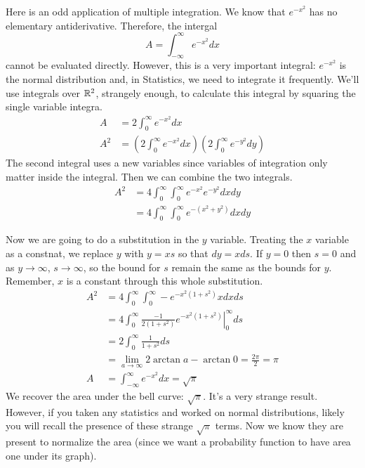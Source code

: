 \documentclass[fleqn,letterpaper]{report}
\begin{document}
\begin{example}
Here is an odd application of multiple integration. We know
that $e^{-x^2}$ has no elementary antiderivative. Therefore,
the intergal
\begin{equation*}
A = \int_{-\infty}^\infty e^{-x^2} dx 
\end{equation*}
cannot be evaluated directly. However, this is a very
important integral: $e^{-x^2}$ is the 
normal distribution and, in Statistics, we need to integrate 
it frequently. We'll use
integrals over $\mathbb{R}^2$, strangely enough, to calculate this
integral by squaring the single variable integra.
\begin{align*}
A & = 2 \int_{0}^\infty e^{-x^2} dx \\
A^2 & = \left( 2 \int_{0}^\infty e^{-x^2} dx \right) \left(2
\int_{0}^\infty e^{-y^2} dy \right) 
\end{align*}
The second integral uses a new variables since variables of
integration only matter inside the integral. Then we can
combine the two integrals.
\begin{align*}
A^2 & = 4 \int_0^\infty \int_0^\infty e^{-x^2} e^{-y^2} dx dy
\\
& = 4 \int_0^\infty \int_0^\infty e^{-(x^2 + y^2)} dx dy 
\end{align*}
\newpage

Now we are going to do a substitution in the $y$ variable.
Treating the $x$ variable as a constnat, we 
replace $y$ with $y = xs$ so that $dy = x ds$.
If $y=0$ then $s=0$ and as $y \rightarrow \infty$, $s
\rightarrow \infty$, so the bound for $s$ remain the same as
the bounds for $y$. Remember, $x$ is a constant through this
whole substitution. 
\begin{align*}
A^2 & = 4 \int_0^\infty \int_0^\infty -e^{-x^2 (1+s^2)} x dx ds
\\
& = 4 \int_0^\infty \left. \frac{-1}{2(1+s^2)} e^{-x^2(1+s^2)}
\right|_0^\infty ds \\
& = 2 \int_0^\infty \frac{1}{1+s^2} ds \\
& = \lim_{a \rightarrow \infty} 2 \arctan a - \arctan 0 =
\frac{2\pi}{2} = \pi \\
A & = \int_{-\infty}^\infty e^{-x^2} dx = \sqrt{\pi}
\end{align*}
We recover the area under the bell curve: $\sqrt{\pi}$. It's a
very strange result. However, if you taken any statistics and
worked on normal distributions, likely you will recall the
presence of these strange $\sqrt{\pi}$ terms. Now we know
they are present to normalize the area (since we want a
probability function to have area one under its graph).
\end{example}
\end{document}
